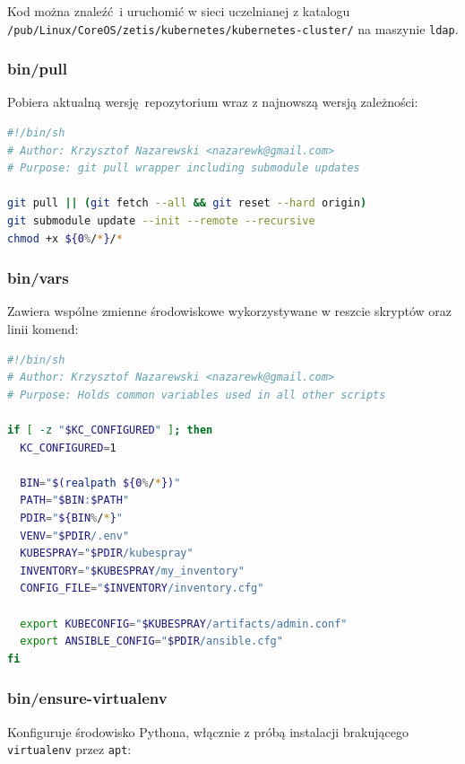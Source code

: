 \documentclass[a4paper,12pt,twoside,openany]{report}
\newcommand{\passthrough}[1]{#1}
\begin{document}
Kod można znaleźć~i uruchomić w sieci uczelnianej z katalogu
\passthrough{\lstinline!/pub/Linux/CoreOS/zetis/kubernetes/kubernetes-cluster/!}
na maszynie \passthrough{\lstinline!ldap!}.

\hypertarget{binpull}{%
\subsubsection{bin/pull}\label{binpull}}

Pobiera aktualną wersję~repozytorium wraz z najnowszą wersją zależności:

\begin{lstlisting}[language=bash]
#!/bin/sh
# Author: Krzysztof Nazarewski <nazarewk@gmail.com>
# Purpose: git pull wrapper including submodule updates

git pull || (git fetch --all && git reset --hard origin)
git submodule update --init --remote --recursive
chmod +x ${0%/*}/*
\end{lstlisting}

\hypertarget{binvars}{%
\subsubsection{bin/vars}\label{binvars}}

Zawiera wspólne zmienne środowiskowe wykorzystywane w reszcie skryptów
oraz linii komend:

\begin{lstlisting}[language=bash]
#!/bin/sh
# Author: Krzysztof Nazarewski <nazarewk@gmail.com>
# Purpose: Holds common variables used in all other scripts

if [ -z "$KC_CONFIGURED" ]; then
  KC_CONFIGURED=1

  BIN="$(realpath ${0%/*})"
  PATH="$BIN:$PATH"
  PDIR="${BIN%/*}"
  VENV="$PDIR/.env"
  KUBESPRAY="$PDIR/kubespray"
  INVENTORY="$KUBESPRAY/my_inventory"
  CONFIG_FILE="$INVENTORY/inventory.cfg"

  export KUBECONFIG="$KUBESPRAY/artifacts/admin.conf"
  export ANSIBLE_CONFIG="$PDIR/ansible.cfg"
fi
\end{lstlisting}

\hypertarget{binensure-virtualenv}{%
\subsubsection{bin/ensure-virtualenv}\label{binensure-virtualenv}}

Konfiguruje środowisko Pythona, włącznie z próbą instalacji brakującego
\passthrough{\lstinline!virtualenv!} przez
\passthrough{\lstinline!apt!}:
\end{document}
